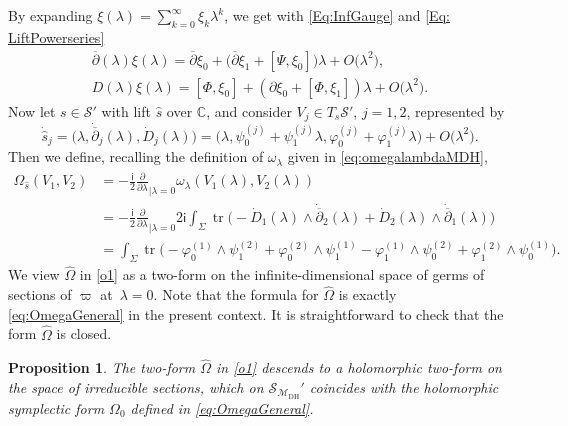 \documentclass[pdftex]{sigma}
\numberwithin{equation}{section}
\newtheorem{Proposition}[Theorem]{Proposition}
\theoremstyle{definition}
\newcommand\C{{\mathbb C}}
\renewcommand{\i}{\mathsf{i}}
\begin{document}
By expanding $\xi(\lambda) = \sum_{k=0}^\infty \xi_k \lambda^k$, we get with \eqref{Eq:InfGauge} and \eqref{Eq: LiftPowerseries}
\begin{gather*}%
{\overline{\partial}}(\lambda)\xi(\lambda) = {\overline{\partial}}\xi_0 + \bigl({\overline{\partial}}\xi_1 + [\Psi, \xi_0]\bigr)\lambda + O\bigl(\lambda^2\bigr), \\
D(\lambda)\xi(\lambda) = [\Phi, \xi_0] +(\partial\xi_0 + [\Phi, \xi_1])\lambda + O\bigl(\lambda^2\bigr) .
\end{gather*}
Now let $s \in \mathcal{S}'$ with lift $\widehat{s}$ over $\C$, and consider
$V_j \in T_s \mathcal{S}'$, $j = 1, 2$, represented by
\[
\dot{\widehat{s}}_j = \bigl(\lambda, \dot{{\overline{\partial}}}_j(\lambda), \dot{D}_j(\lambda)\bigr)
 = \bigl(\lambda, \psi^{(j)}_0 + \psi^{(j)}_1\lambda , \varphi_0^{(j)} + \varphi_1^{(j)}\lambda \bigr) + O\bigl(\lambda^2\bigr).
\]
Then we define, recalling the definition of $\omega_\lambda$ given in \eqref{eq:omegalambdaMDH},
\begin{align}
\widehat{\Omega}_{\widehat{s}}(V_1, V_2) & =
-\frac{\i}{2}\frac{\partial}{\partial\lambda}_{|\lambda=0}\omega_\lambda(V_1(\lambda), V_2(\lambda))\nonumber\\
& =-\frac{\i}{2} \frac{\partial}{\partial \lambda}_{|\lambda = 0} 2\i \int_\Sigma \operatorname{tr}\bigl(-\dot{D}_1(\lambda)
\wedge \dot{{\overline{\partial}}}_2(\lambda) + \dot{D}_2(\lambda) \wedge \dot{{\overline{\partial}}}_1(\lambda)\bigr)\nonumber \\
& = \int_\Sigma \operatorname{tr}\bigl(-\varphi_0^{(1)} \wedge \psi_1^{(2)} + \varphi_0^{(2)} \wedge \psi_1^{(1)} -
\varphi_1^{(1)} \wedge \psi_{0}^{(2)} + \varphi_1^{(2)} \wedge \psi_0^{(1)}\bigr).\label{o1}
\end{align}
We view $\widehat{\Omega}$ in \eqref{o1} as a two-form on the infinite-dimensional space of germs of
sections of $\varpi$ at~${\lambda = 0}$. Note that the formula for $\widehat{\Omega}$ is
exactly \eqref{eq:OmegaGeneral} in the present context. It is straightforward to check that the form
$\widehat{\Omega}$ is closed.

\begin{Proposition}\label{p:OmegaHol}
The two-form $\widehat{\Omega}$ in \eqref{o1} descends to a holomorphic two-form on the space of
irreducible sections, which on $\mathcal S_{\mathcal{M}_{\mathrm{DH}}}'$ coincides with the holomorphic
symplectic form $\Omega_0$ defined in \eqref{eq:OmegaGeneral}.
\end{Proposition}
\end{document}
